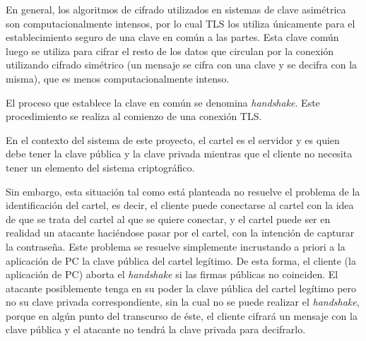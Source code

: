 En general, los algoritmos de cifrado utilizados en sistemas de clave asimétrica son computacionalmente intensos, por lo cual TLS los utiliza únicamente para el establecimiento seguro de una clave en común a las partes. Esta clave común luego se utiliza para cifrar el resto de los datos que circulan por la conexión utilizando cifrado simétrico (un mensaje se cifra con una clave y se decifra con la misma), que es menos computacionalmente intenso.

El proceso que establece la clave en común se denomina \emph{handshake}. Este procedimiento se realiza al comienzo de una conexión TLS.

En el contexto del sistema de este proyecto, el cartel es el servidor y es quien debe tener la clave pública y la clave privada mientras que el cliente no necesita tener un elemento del sistema criptográfico.

Sin embargo, esta situación tal como está planteada no resuelve el problema de la identificación del cartel, es decir, el cliente puede conectarse al cartel con la idea de que se trata del cartel al que se quiere conectar, y el cartel puede ser en realidad un atacante haciéndose pasar por el cartel, con la intención de capturar la contraseña. Este problema se resuelve simplemente incrustando a priori a la aplicación de PC la clave pública del cartel legítimo. De esta forma, el cliente (la aplicación de PC) aborta el \emph{handshake} si las firmas públicas no coinciden. El atacante posiblemente tenga en su poder la clave pública del cartel legítimo pero no su clave privada correspondiente, sin la cual no se puede realizar el \emph{handshake}, porque en algún punto del transcurso de éste, el cliente cifrará un mensaje con la clave pública y el atacante no tendrá la clave privada para decifrarlo.